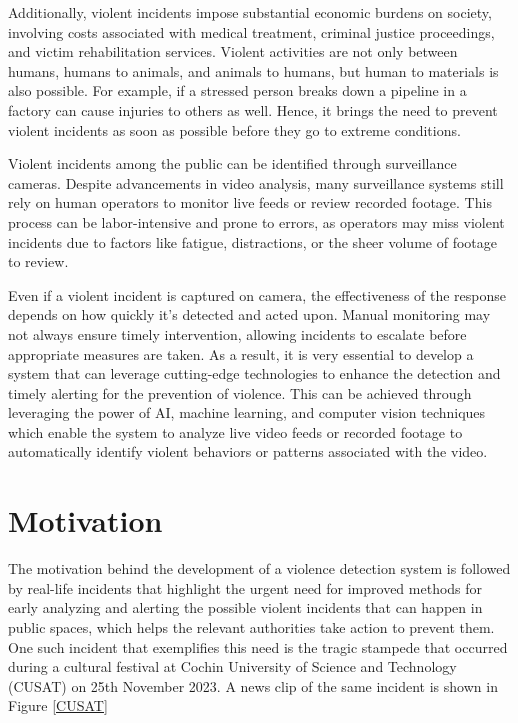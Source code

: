 \noindent Additionally, violent incidents impose substantial economic burdens on society, involving costs associated with medical treatment, criminal justice proceedings, and victim rehabilitation services. Violent activities are not only between humans, humans to animals, and animals to humans, but human to materials is also possible. For example, if a stressed person breaks down a pipeline in a factory can cause injuries to others as well. Hence, it brings the need to prevent violent incidents as soon as possible before they go to extreme conditions.

\noindent Violent incidents among the public can be identified through surveillance cameras\cite{violence_ai}. Despite advancements in video analysis, many surveillance systems still rely on human operators to monitor live feeds or review recorded footage. This process can be labor-intensive and prone to errors, as operators may miss violent incidents due to factors like fatigue, distractions, or the sheer volume of footage to review.

\noindent Even if a violent incident is captured on camera, the effectiveness of the response depends on how quickly it's detected and acted upon. Manual monitoring may not always ensure timely intervention, allowing incidents to escalate before appropriate measures are taken\cite{manual_Violence}. As a result, it is very essential to develop a system that can leverage cutting-edge technologies to enhance the detection and timely alerting for the prevention of violence. This can be achieved through leveraging the power of AI, machine learning, and computer vision techniques which enable the system to analyze live video feeds or recorded footage to automatically identify violent behaviors or patterns associated with the video.

\clearpage

\section*{Motivation}

\noindent The motivation behind the development of a violence detection system is followed by real-life incidents that highlight the urgent need for improved methods for early analyzing and alerting the possible violent incidents that can happen in public spaces, which helps the relevant authorities take action to prevent them. One such incident that exemplifies this need is the tragic stampede that occurred during a cultural festival at Cochin University of Science and Technology (CUSAT) on 25th November 2023. A news clip of the same incident is shown in Figure \ref{CUSAT}\\

